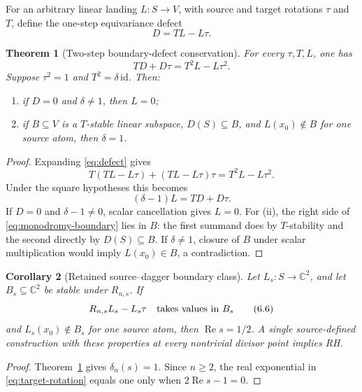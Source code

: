 \documentclass[11pt]{article}
\newtheorem{theorem}{Theorem}[section]
\newtheorem{corollary}[theorem]{Corollary}
\theoremstyle{definition}
\theoremstyle{remark}
\newcommand{\C}{\mathbb C}
\newcommand{\Rea}{\operatorname{Re}}
\begin{document}
For an arbitrary linear landing \(L:S\to V\), with source and target
rotations \(\tau\) and \(T\), define the one-step equivariance defect
\[
                         D=TL-L\tau.
\tag{6.3}\label{eq:defect}
\]

\begin{theorem}[Two-step boundary-defect conservation]
\label{thm:defect-conservation}
For every \(\tau,T,L\), one has
\[
                         TD+D\tau=T^2L-L\tau^2.
\tag{6.4}\label{eq:two-step-defect}
\]
Suppose \(\tau^2=1\) and \(T^2=\delta\,\mathrm{id}\).  Then:
\begin{enumerate}[label=\textup{(\roman*)}]
\item if \(D=0\) and \(\delta\neq1\), then \(L=0\);
\item if \(B\subseteq V\) is a \(T\)-stable linear subspace,
      \(D(S)\subseteq B\), and \(L(x_0)\notin B\) for one source atom,
      then \(\delta=1\).
\end{enumerate}
\end{theorem}

\begin{proof}
Expanding \eqref{eq:defect} gives
\[
 T(TL-L\tau)+(TL-L\tau)\tau=T^2L-L\tau^2.
\]
Under the square hypotheses this becomes
\[
                         (\delta-1)L=TD+D\tau.
\tag{6.5}\label{eq:monodromy-boundary}
\]
If \(D=0\) and \(\delta-1\neq0\), scalar cancellation gives \(L=0\).
For (ii), the right side of \eqref{eq:monodromy-boundary} lies in \(B\):
the first summand does by \(T\)-stability and the second directly by
\(D(S)\subseteq B\).  If \(\delta\neq1\), closure of \(B\) under scalar
multiplication would imply \(L(x_0)\in B\), a contradiction.
\end{proof}

\begin{corollary}[Retained source--dagger boundary class]
\label{cor:boundary-class-rigidity}
Let \(L_s:S\to\C^2\), and let \(B_s\subseteq\C^2\) be stable under
\(R_{n,s}\).  If
\[
 R_{n,s}L_s-L_s\tau\quad\hbox{takes values in }B_s
\tag{6.6}\label{eq:defect-boundary}
\]
and \(L_s(x_0)\notin B_s\) for one source atom, then
\(\Rea s=1/2\).  A single source-defined construction with these properties
at every nontrivial divisor point implies RH.
\end{corollary}

\begin{proof}
Theorem~\ref{thm:defect-conservation} gives \(\delta_n(s)=1\).  Since
\(n\geq2\), the real exponential in \eqref{eq:target-rotation} equals one
only when \(2\Rea s-1=0\).
\end{proof}
\end{document}
